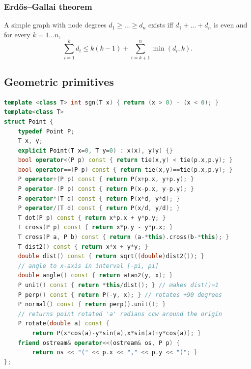 \begin{multicols}{\Columns}
	\subsubsection{Erdős–Gallai theorem}
		A simple graph with node degrees $d_1 \ge \dots \ge d_n$ exists iff $d_1 + \dots + d_n$ is even and for every $k = 1\dots n$,
		\[ \sum _{i=1}^{k}d_{i}\leq k(k-1)+\sum _{i=k+1}^{n}\min(d_{i},k). \]



\subsection{Geometric primitives}
\begin{lstlisting}[language=C++]
template <class T> int sgn(T x) { return (x > 0) - (x < 0); }
template<class T>
struct Point {
	typedef Point P;
	T x, y;
	explicit Point(T x=0, T y=0) : x(x), y(y) {}
	bool operator<(P p) const { return tie(x,y) < tie(p.x,p.y); }
	bool operator==(P p) const { return tie(x,y)==tie(p.x,p.y); }
	P operator+(P p) const { return P(x+p.x, y+p.y); }
	P operator-(P p) const { return P(x-p.x, y-p.y); }
	P operator*(T d) const { return P(x*d, y*d); }
	P operator/(T d) const { return P(x/d, y/d); }
	T dot(P p) const { return x*p.x + y*p.y; }
	T cross(P p) const { return x*p.y - y*p.x; }
	T cross(P a, P b) const { return (a-*this).cross(b-*this); }
	T dist2() const { return x*x + y*y; }
	double dist() const { return sqrt((double)dist2()); }
	// angle to x-axis in interval [-pi, pi]
	double angle() const { return atan2(y, x); }
	P unit() const { return *this/dist(); } // makes dist()=1
	P perp() const { return P(-y, x); } // rotates +90 degrees
	P normal() const { return perp().unit(); }
	// returns point rotated 'a' radians ccw around the origin
	P rotate(double a) const {
		return P(x*cos(a)-y*sin(a),x*sin(a)+y*cos(a)); }
	friend ostream& operator<<(ostream& os, P p) {
		return os << "(" << p.x << "," << p.y << ")"; }
};
\end{lstlisting}


\end{multicols}
